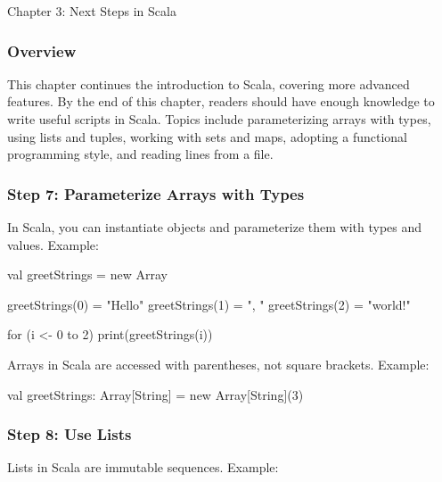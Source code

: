\begin{notes}{Chapter 3: Next Steps in Scala}
    \subsubsection*{Overview}

    This chapter continues the introduction to Scala, covering more advanced features. By the end of this chapter, readers should have enough knowledge to write useful scripts in Scala. Topics include 
    parameterizing arrays with types, using lists and tuples, working with sets and maps, adopting a functional programming style, and reading lines from a file.

    \subsubsection*{Step 7: Parameterize Arrays with Types}

    In Scala, you can instantiate objects and parameterize them with types and values. Example:

    \begin{highlight}

    \begin{code}[Scala]
    val greetStrings = new Array 

    greetStrings(0) = "Hello"
    greetStrings(1) = ", "
    greetStrings(2) = "world!\n"

    for (i <- 0 to 2)
        print(greetStrings(i))
    \end{code}

    \end{highlight}

    Arrays in Scala are accessed with parentheses, not square brackets. Example:

    \begin{highlight}

    \begin{code}[Scala]
    val greetStrings: Array[String] = new Array[String](3)
    \end{code}

    \end{highlight}

    \subsubsection*{Step 8: Use Lists}

    Lists in Scala are immutable sequences. Example:


\end{notes}

